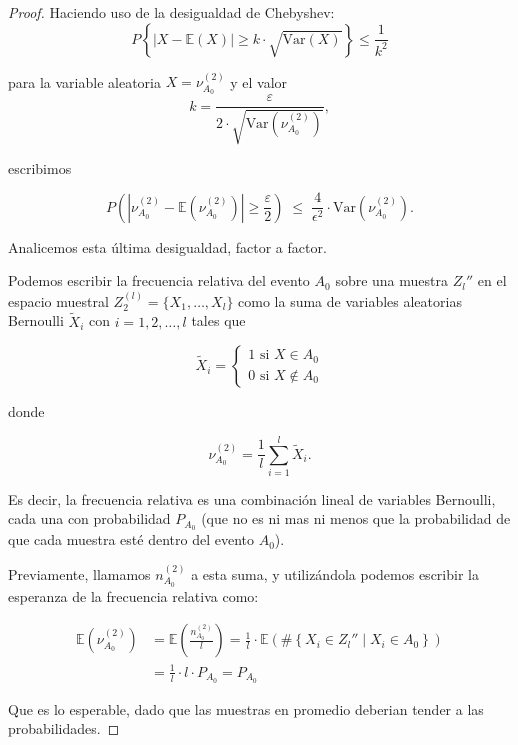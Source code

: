 \documentclass{report}
\begin{document}
\begin{proof}
Haciendo uso de la desigualdad de Chebyshev: 
\[
P\left\{|X- \mathbb{E}\left(X \right)| \geq k \cdot \sqrt{\text{Var}(X)} \right\} \leq \frac{1}{k^2}
\]

para la variable aleatoria $X=\nu_{A_0}^{(2)}$ y el valor
\[
k= \frac{\varepsilon}{2\cdot\sqrt{\text{Var}\left(\nu_{A_0}^{(2)}\right)}}   ,
\]

escribimos

\begin{equation}
P\left(|\nu_{A_0}^{(2)} - \mathbb{E}\left(\nu_{A_0}^{(2)} \right)| \geq \frac{\varepsilon}{2}\right) 
\;\leq\; \frac{4}{\epsilon^2}\cdot \text{Var}\left(\nu_{A_0}^{(2)}\right). \label{Chebyshev aplicada a frecuencia relativa}
\end{equation}
\bigskip

Analicemos esta última desigualdad, factor a factor.\newline

Podemos escribir la frecuencia relativa del evento $A_0$ sobre una muestra $Z_l''$ en el espacio muestral $Z^{(l)}_2=\{X_1,\dots,X_l\}$ como la suma de variables aleatorias
Bernoulli $\tilde{X}_i$ con $i=1,2,\dots,l$ tales que

\[
    \tilde{X}_i = \begin{cases} 1 \text{ si } X\in A_0\\
        0 \text{ si } X\notin A_0
\end{cases}
\]

donde

\[
    \nu_{A_0}^{(2)} = \frac{1}{l}\sum_{i=1}^l \tilde{X}_i.
\]

Es decir, la frecuencia relativa es una combinación lineal de variables Bernoulli, cada una con probabilidad $P_{A_0}$ (que no es ni mas ni
menos que la probabilidad de que cada muestra esté dentro del evento $A_0$).\newline

Previamente, llamamos $n_{A_0}^{(2)}$ a esta suma, y utilizándola podemos escribir la esperanza de la frecuencia relativa como:

\[
\begin{aligned}
    \mathbb{E}\left(\nu_{A_0}^{(2)} \right) &= \mathbb{E}\left(\frac{n_{A_0}^{(2)}}{l} \right) =  \frac{1}{l} \cdot \mathbb{E}\left( \#\left\{X_i\in Z_l''\mid X_i\in A_0\right\}\right)\\
    &= \frac{1}{l} \cdot l \cdot P_{A_0} = P_{A_0}
\end{aligned}
\]

Que es lo esperable, dado que las muestras en promedio deberian tender a las probabilidades.\newline


\end{proof}
\end{document}
